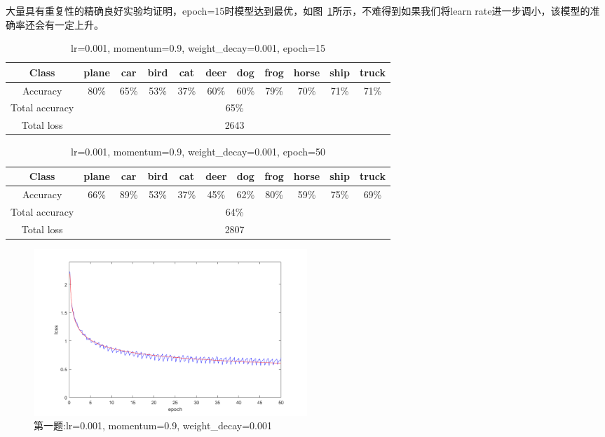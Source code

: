 \documentclass[a4paper,UTF8]{article}
\numberwithin{equation}{section}
\begin{document}
\begin{enumerate}[(1)]
	大量具有重复性的精确良好实验均证明，epoch=15时模型达到最优，如图~\ref{p1.3}所示，不难得到如果我们将learn rate进一步调小，该模型的准确率还会有一定上升。
	\begin{table}[!h]
		\centering
		\caption{lr=0.001, momentum=0.9, weight\_decay=0.001, epoch=15}
		\label{figure1}
		\begin{tabular}{|c|c|c|c|c|c|c|c|c|c|c|}
			\hline
			Class          & plane & car  & bird & cat  & deer & dog  & frog & horse & ship & truck \\ \hline
			Accuracy       & 80\%  & 65\% & 53\% & 37\% & 60\% & 60\% & 79\% & 70\%  & 71\% & 71\%  \\ \hline
			Total accuracy & \multicolumn{10}{c|}{65\%}                                             \\ \hline
			Total loss 	   & \multicolumn{10}{c|}{2643}                                             \\ \hline
		\end{tabular}
	\end{table}

	\begin{table}[!h]
	\centering
	\caption{lr=0.001, momentum=0.9, weight\_decay=0.001, epoch=50}
	\label{p1.2}
	\begin{tabular}{|c|c|c|c|c|c|c|c|c|c|c|}
		\hline
		Class          & plane & car  & bird & cat  & deer & dog  & frog & horse & ship & truck \\ \hline
		Accuracy       & 66\%  & 89\% & 53\% & 37\% & 45\% & 62\% & 80\% & 59\%  & 75\% & 69\%  \\ \hline
		Total accuracy & \multicolumn{10}{c|}{64\%}                                             \\ \hline
		Total loss 	   & \multicolumn{10}{c|}{2807}                                             \\ \hline
	\end{tabular}
	\end{table}
	
	\begin{figure}[!h]
		\centering   
		\includegraphics[width=0.5\textwidth, height=0.5\textwidth]{p1.png}  
		\caption{第一题:lr=0.001, momentum=0.9, weight\_decay=0.001} 
		\label{p1.3}
	\end{figure}
	

\end{enumerate}
\end{document}
